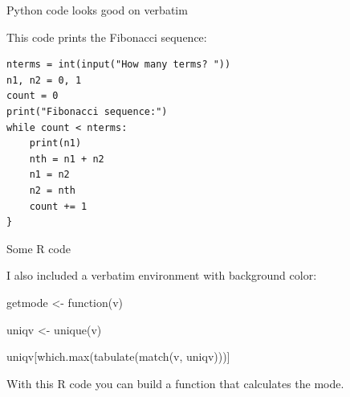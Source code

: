 
\begin{frame}[fragile]{Python code looks good on verbatim}

This code prints the Fibonacci sequence:

\begin{verbatim}
nterms = int(input("How many terms? "))
n1, n2 = 0, 1
count = 0
print("Fibonacci sequence:")
while count < nterms:
    print(n1)
    nth = n1 + n2
    n1 = n2
    n2 = nth
    count += 1
}
\end{verbatim}

\end{frame}


\begin{frame}[fragile]{Some R code}

I also included a verbatim environment with background color:

\begin{cverbatim}
getmode <- function(v) {
  
  uniqv <- unique(v)
  
  uniqv[which.max(tabulate(match(v, uniqv)))]
  
}
\end{cverbatim}

With this R code you can build a function that calculates the mode.

\end{frame}



















